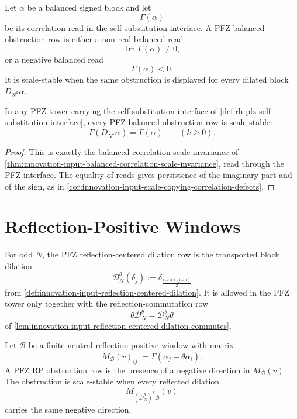 \begin{definition}
\label{def:rh-pfz-balanced-obstruction-row}
Let $\alpha$ be a balanced signed block and let
$$
\Gamma(\alpha)
$$
be its correlation read in the self-substitution interface.  A PFZ
balanced obstruction row is either a non-real balanced read
$$
\operatorname{Im}\Gamma(\alpha)\ne0,
$$
or a negative balanced read
$$
\Gamma(\alpha)<0.
$$
It is scale-stable when the same obstruction is displayed for every
dilated block $D_{N^k}\alpha$.
\end{definition}

\begin{theorem}
\label{thm:rh-pfz-balanced-obstruction-dilation-persistence}
In any PFZ tower carrying the self-substitution interface of
\autoref{def:rh-pfz-self-substitution-interface}, every PFZ balanced
obstruction row is scale-stable:
$$
\Gamma(D_{N^k}\alpha)=\Gamma(\alpha)
\qquad
(k\ge0).
$$
\end{theorem}

\begin{proof}
This is exactly the balanced-correlation scale invariance of
\autoref{thm:innovation-input-balanced-correlation-scale-invariance},
read through the PFZ interface.  The equality of reads gives persistence
of the imaginary part and of the sign, as in
\autoref{cor:innovation-input-scale-copying-correlation-defects}.
\end{proof}

\section{Reflection-Positive Windows}
\label{sec:rh-pfz-reflection-positive-windows}

\begin{definition}
\label{def:rh-pfz-reflection-centered-dilation-row}
For odd $N$, the PFZ reflection-centered dilation row is the transported
block dilation
$$
\mathcal D_N^\theta(\delta_j)
:=
\delta_{\frac{1+N(2j-1)}2}
$$
from \autoref{def:innovation-input-reflection-centered-dilation}.  It is
allowed in the PFZ tower only together with the reflection-commutation row
$$
\theta\mathcal D_N^\theta
=
\mathcal D_N^\theta\theta
$$
of \autoref{lem:innovation-input-reflection-centered-dilation-commutes}.
\end{definition}

\begin{definition}
\label{def:rh-pfz-rp-obstruction-row}
Let $\mathcal B$ be a finite neutral reflection-positive window with
matrix
$$
M_{\mathcal B}(v)_{ij}
:=
\Gamma(\alpha_j-\theta\alpha_i).
$$
A PFZ RP obstruction row is the presence of a negative direction in
$M_{\mathcal B}(v)$.  The obstruction is scale-stable when every reflected
dilation
$$
M_{(\mathcal D_N^\theta)^k\mathcal B}(v)
$$
carries the same negative direction.
\end{definition}

